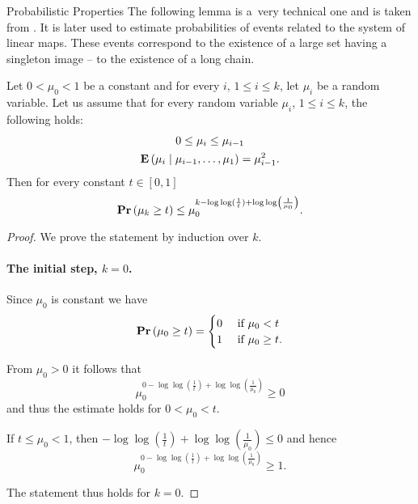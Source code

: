 \begin{section}{Probabilistic Properties}
The following lemma is a~very technical one and is taken from \cite{DBLP:books/sp/Mehlhorn84}. It is later used to estimate probabilities of events related to the system of linear maps. These events correspond to the existence of a large set having a singleton image -- to the existence of a long chain.
\begin{lemma}
\label{lemma-random-variable}
Let $0 < \mu_0 < 1$ be a constant and for every $i$, $1 \leq i \leq k$, let $\mu_i$ be a random variable. Let us assume that for every random variable $\mu_i$, $1 \leq i \leq k$, the following holds:
\begin{gather*}
0 \leq \mu_i \leq \mu_{i - 1} \\
\mathbf{E}\left( \mu_i \mid \mu_{i-1}, \dots, \mu_1 \right) = \mu_{i-1}^{2} \text{.}
\end{gather*}
Then for every constant $t \in \left[0, 1 \right]$ \[ \mathbf{Pr}\left(\mu_k \geq t\right) \leq \mu_0^{k - \log \log (\frac{1}{t}) + \log \log \left(\frac{1}{\mu_0}\right)} \text{.} \]
\end{lemma}
\begin{proof}
We prove the statement by induction over $k$. 

\paragraph*{The initial step, $k = 0$.}
Since $\mu_0$ is constant we have
\[
	\mathbf{Pr}\left(\mu_0 \geq t\right) = \begin{cases}
		0 & \text{ if } \mu_0 < t \\
		1 & \text{ if } \mu_0 \geq t \text{.} \\
	\end{cases}
\]

From $\mu_0 > 0$ it follows that
\[
	\mu_0^{0 - \log \log \left(\frac{1}{t}\right) + \log \log \left(\frac{1}{\mu_0}\right)} \geq 0
\]
and thus the estimate holds for $0 < \mu_0 < t$.

If $t \leq \mu_0 < 1$, then $-\log \log \left(\frac{1}{t}\right) + \log \log \left(\frac{1}{\mu_0}\right) \leq 0$ and hence
\[
	\mu_0^{0 - \log \log \left(\frac{1}{t}\right) + \log \log \left(\frac{1}{\mu_0}\right)} \geq 1 \text{.}
\]

The statement thus holds for $k = 0$.


\end{proof}
\end{section}
